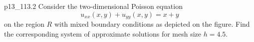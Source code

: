 
\begin{problemwithimage}{p13_1}{13.2}
  Consider the two-dimensional Poisson equation
  \begin{equation*}
    u_{x x}(x,y) + u_{yy}(x,y) = x + y
  \end{equation*}
  on the region $R$ with mixed boundary conditions as depicted on the figure.
  Find the corresponding system of approximate solutions for mesh size $h = \num{4,5}$.
\end{problemwithimage}

